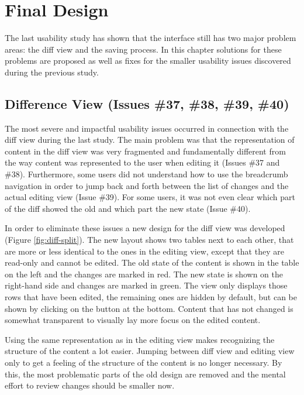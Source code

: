 \chapter{Final Design} \label{chapter:final-design}
The last usability study has shown that the interface still has two major problem areas: the diff view and the saving process. In this chapter solutions for these problems are proposed as well as fixes for the smaller usability issues discovered during the previous study. 

\section{Difference View (Issues \#37, \#38, \#39, \#40)}
The most severe and impactful usability issues occurred in connection with the diff view during the last study. The main problem was that the representation of content in the diff view was very fragmented and fundamentally different from the way content was represented to the user when editing it (Issues \#37 and \#38). Furthermore, some users did not understand how to use the breadcrumb navigation in order to jump back and forth between the list of changes and the actual editing view (Issue \#39). For some users, it was not even clear which part of the diff showed the old and which part the new state (Issue \#40).

In order to eliminate these issues a new design for the diff view was developed (Figure \ref{fig:diff-split}). The new layout shows two tables next to each other, that are more or less identical to the ones in the editing view, except that they are read-only and cannot be edited. The old state of the content is shown in the table on the left and the changes are marked in red. The new state is shown on the right-hand side and changes are marked in green. The view only displays those rows that have been edited, the remaining ones are hidden by default, but can be shown by clicking on the button at the bottom. Content that has not changed is somewhat transparent to visually lay more focus on the edited content.

Using the same representation as in the editing view makes recognizing the structure of the content a lot easier. Jumping between diff view and editing view only to get a feeling of the structure of the content is no longer necessary. By this, the most problematic parts of the old design are removed and the mental effort to review changes should be smaller now.



